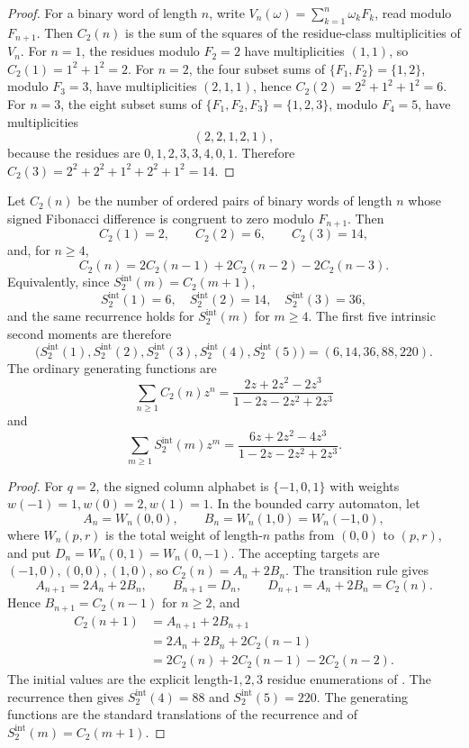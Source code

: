 \begin{proof}
For a binary word of length \(n\), write
\(V_n(\omega)=\sum_{k=1}^n\omega_kF_k\), read modulo \(F_{n+1}\).  Then
\(C_2(n)\) is the sum of the squares of the residue-class multiplicities of
\(V_n\).  For \(n=1\), the residues modulo \(F_2=2\) have multiplicities
\((1,1)\), so \(C_2(1)=1^2+1^2=2\).  For \(n=2\), the four subset sums of
\(\{F_1,F_2\}=\{1,2\}\), modulo \(F_3=3\), have multiplicities
\((2,1,1)\), hence \(C_2(2)=2^2+1^2+1^2=6\).  For \(n=3\), the eight subset sums of
\(\{F_1,F_2,F_3\}=\{1,2,3\}\), modulo \(F_4=5\), have multiplicities
\[
  (2,2,1,2,1),
\]
because the residues are \(0,1,2,3,3,4,0,1\).  Therefore
\(C_2(3)=2^2+2^2+1^2+2^2+1^2=14\).
\end{proof}

\begin{theorem}
\label{thm:intrinsic-second-moment-recurrence}
Let \(C_2(n)\) be the number of ordered pairs of binary words of length \(n\)
whose signed Fibonacci difference is congruent to zero modulo \(F_{n+1}\).  Then
\[
  C_2(1)=2,
  \qquad C_2(2)=6,
  \qquad C_2(3)=14,
\]
and, for \(n\ge4\),
\[
  C_2(n)=2C_2(n-1)+2C_2(n-2)-2C_2(n-3).
\]
Equivalently, since \(S_2^{\mathrm{int}}(m)=C_2(m+1)\),
\[
  S_2^{\mathrm{int}}(1)=6,
  \quad S_2^{\mathrm{int}}(2)=14,
  \quad S_2^{\mathrm{int}}(3)=36,
\]
and the same recurrence holds for \(S_2^{\mathrm{int}}(m)\) for \(m\ge4\).  The
first five intrinsic second moments are therefore
\[
  \bigl(S_2^{\mathrm{int}}(1),S_2^{\mathrm{int}}(2),S_2^{\mathrm{int}}(3),
  S_2^{\mathrm{int}}(4),S_2^{\mathrm{int}}(5)\bigr)
  =(6,14,36,88,220).
\]
The
ordinary generating functions are
\[
  \sum_{n\ge1}C_2(n)z^n
  =\frac{2z+2z^2-2z^3}{1-2z-2z^2+2z^3}
\]
and
\[
  \sum_{m\ge1}S_2^{\mathrm{int}}(m)z^m
  =\frac{6z+2z^2-4z^3}{1-2z-2z^2+2z^3}.
\]
\end{theorem}

\begin{proof}
For \(q=2\), the signed column alphabet is \(\{-1,0,1\}\) with weights
\(w(-1)=1,w(0)=2,w(1)=1\).  In the bounded carry automaton, let
\[
  A_n=W_n(0,0),\qquad B_n=W_n(1,0)=W_n(-1,0),
\]
where \(W_n(p,r)\) is the total weight of length-\(n\) paths from \((0,0)\) to
\((p,r)\), and put \(D_n=W_n(0,1)=W_n(0,-1)\).  The accepting targets are
\((-1,0),(0,0),(1,0)\), so \(C_2(n)=A_n+2B_n\).  The transition rule gives
\[
  A_{n+1}=2A_n+2B_n,
  \qquad B_{n+1}=D_n,
  \qquad D_{n+1}=A_n+2B_n=C_2(n).
\]
Hence \(B_{n+1}=C_2(n-1)\) for \(n\ge2\), and
\[
\begin{aligned}
  C_2(n+1)
    &=A_{n+1}+2B_{n+1} \\
    &=2A_n+2B_n+2C_2(n-1) \\
    &=2C_2(n)+2C_2(n-1)-2C_2(n-2).
\end{aligned}
\]
The initial values are the explicit length-\(1,2,3\) residue enumerations of
.
The recurrence then gives \(S_2^{\mathrm{int}}(4)=88\) and
\(S_2^{\mathrm{int}}(5)=220\).
The generating functions are the standard translations of the recurrence and of
\(S_2^{\mathrm{int}}(m)=C_2(m+1)\).
\end{proof}

